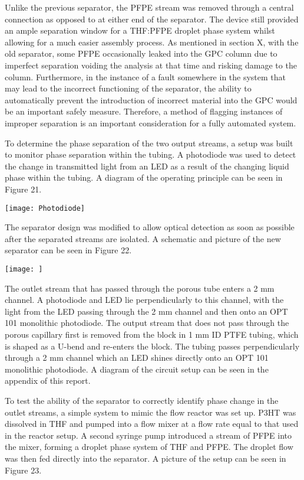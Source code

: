 Unlike the previous separator, the PFPE stream was removed through a central connection as opposed to at either end of the separator. The device still provided an ample separation window for a THF:PFPE droplet phase system whilst allowing for a much easier assembly process.
As mentioned in section X, with the old separator, some PFPE occasionally leaked into the GPC column due to imperfect separation voiding the analysis at that time and risking damage to the column. Furthermore, in the instance of a fault somewhere in the system that may lead to the incorrect functioning of the separator, the ability to automatically prevent the introduction of incorrect material into the GPC would be an important safely measure. Therefore, a method of flagging instances of improper separation is an important consideration for a fully automated system.

To determine the phase separation of the two output streams, a setup was built to monitor phase separation within the tubing. A photodiode was used to detect the change in transmitted light from an LED as a result of the changing liquid phase within the tubing. A diagram of the operating principle can be seen in Figure 21.

\texttt{[image: Photodiode]}

The separator design was modified to allow optical detection as soon as possible after the separated streams are isolated. A schematic and picture of the new separator can be seen in Figure 22.

\texttt{[image: ]}

The outlet stream that has passed through the porous tube enters a 2 mm channel. A photodiode and LED lie perpendicularly to this channel, with the light from the LED passing through the 2 mm channel and then onto an OPT 101 monolithic photodiode. The output stream that does not pass through the porous capillary first is removed from the block in 1 mm ID PTFE tubing, which is shaped as a U-bend and re-enters the block. The tubing passes perpendicularly through a 2 mm channel which an LED shines directly onto an OPT 101 monolithic photodiode. A diagram of the circuit setup can be seen in the appendix of this report. 

To test the ability of the separator to correctly identify phase change in the outlet streams, a simple system to mimic the flow reactor was set up. P3HT was dissolved in THF and pumped into a flow mixer at a flow rate equal to that used in the reactor setup. A second syringe pump introduced a stream of PFPE into the mixer, forming a droplet phase system of THF and PFPE. The droplet flow was then fed directly into the separator. A picture of the setup can be seen in Figure 23.

